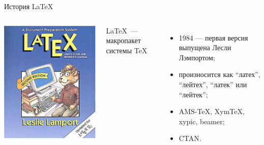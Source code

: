 \begin{frame}{История \LaTeX}
    \begin{columns}
        \centering
        \includegraphics[width=1\linewidth]{../Figures/artlatex.jpg}

        \LaTeX~--- макропакет системы \TeX
        \begin{itemize}
            \pause\item 1984 --- первая версия выпущена Лесли Лэмпортом;
            \pause\item произносится как ``латех'', ``лейтех'', ``латек'' или ``лейтек'';
            \pause\item AMS-\TeX, Xym\TeX, xypic, beamer;
            \pause\item CTAN.
        \end{itemize}
    \end{columns}
\end{frame}

